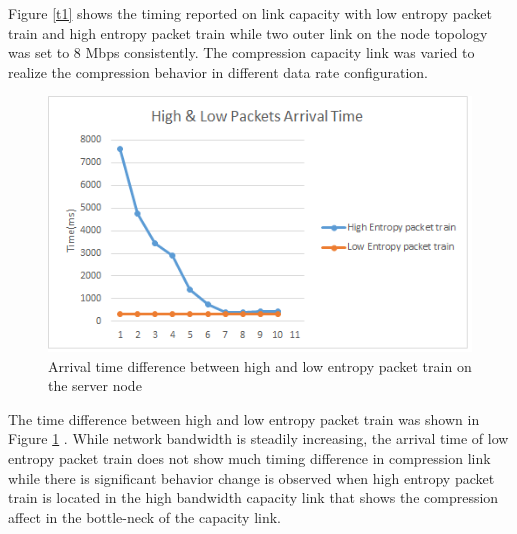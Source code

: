 \documentclass[sigconf]{acmart}
\begin{document}
Figure \ref{t1} shows the timing reported on link capacity with low entropy packet train and high entropy packet train while two outer link on the node topology was set to 8 Mbps consistently. The compression capacity link was varied to realize the compression behavior in different data rate configuration. 

 \begin{figure}[h]
  \centering
  \includegraphics[width=\linewidth]{4}
  \caption{Arrival time difference between high and low entropy packet train on the server node }
  \label{t2}
\end{figure} 

The time difference between high and low entropy packet train was shown in Figure \ref{t2} . While network bandwidth is steadily increasing, the arrival time of low entropy packet train does not show much timing difference in compression link while there is significant behavior change is observed when high entropy packet train is located in the high bandwidth capacity link that shows the compression affect in the bottle-neck of the capacity link. 
\end{document}
